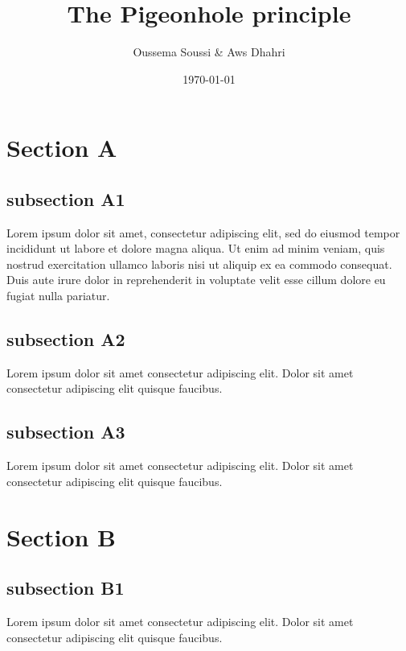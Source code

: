 \documentclass[10pt,a4paper]{article}
\title{The Pigeonhole principle}      %
\author{Oussema Soussi \& Aws Dhahri}                 %
\date{\today}                     %
\begin{document}
\maketitle
\hypersetup{linkcolor=black}
\tableofcontents
\newpage

\section{Section A}
\subsection{subsection A1}
Lorem ipsum dolor sit amet, consectetur adipiscing elit, sed do eiusmod tempor incididunt ut labore et dolore magna aliqua. Ut enim ad minim veniam, quis nostrud exercitation ullamco laboris nisi ut aliquip ex ea commodo consequat. Duis aute irure dolor in reprehenderit in voluptate velit esse cillum dolore eu fugiat nulla pariatur.
\subsection{subsection A2}
\begin{center}
\begin{walkthrough}
    Lorem ipsum dolor sit amet consectetur adipiscing elit. Dolor sit amet consectetur adipiscing elit quisque faucibus.
\end{walkthrough}
\end{center}
\subsection{subsection A3}
\begin{center}
\begin{theorem}
    Lorem ipsum dolor sit amet consectetur adipiscing elit. Dolor sit amet consectetur adipiscing elit quisque faucibus.
\end{theorem}
\end{center}
\section{Section B}
\subsection{subsection B1}
\begin{center}
\begin{remarkbox}
    Lorem ipsum dolor sit amet consectetur adipiscing elit. Dolor sit amet consectetur adipiscing elit quisque faucibus.
\end{remarkbox}
\end{center}
\end{document}
